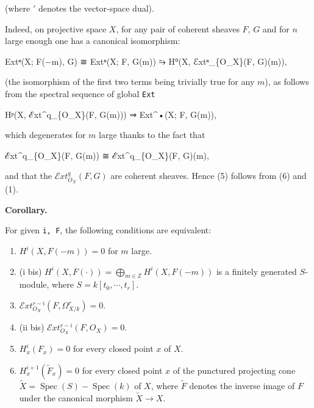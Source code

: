 \documentclass[
]{article}
\newenvironment{Shaded}{}{}
\newcommand{\NormalTok}[1]{#1}
\providecommand{\tightlist}{%
  \setlength{\itemsep}{0pt}\setlength{\parskip}{0pt}}
\begin{document}
(where \('\) denotes the vector-space dual).

Indeed, on projective space \(X\), for any pair of coherent sheaves
\(F\), \(G\) and for \(n\) large enough one has a canonical isomorphism:

\begin{Shaded}
\begin{Highlighting}[]
\NormalTok{Extⁿ(X; F(−m), G) ≅ Extⁿ(X; F, G(m)) ⥲ H⁰(X, ℰxtⁿ\_\{O\_X\}(F, G)(m)),}
\end{Highlighting}
\end{Shaded}

(the isomorphism of the first two terms being trivially true for any
\(m\)), as follows from the spectral sequence of global \texttt{Ext}

\begin{Shaded}
\begin{Highlighting}[]
\NormalTok{Hᵖ(X, ℰxt\^{}q\_\{O\_X\}(F, G(m))) ⇒ Ext\^{}•(X; F, G(m)),}
\end{Highlighting}
\end{Shaded}

which degenerates for \(m\) large thanks to the fact that

\begin{Shaded}
\begin{Highlighting}[]
\NormalTok{ℰxt\^{}q\_\{O\_X\}(F, G(m)) ≅ ℰxt\^{}q\_\{O\_X\}(F, G)(m),}
\end{Highlighting}
\end{Shaded}

and that the \(\mathcal{E}xt^{q}_{O_{X}}(F, G)\) are coherent sheaves.
Hence (5) follows from (6) and (1).

\textbf{Corollary.}

For given \texttt{i,\ F}, the following conditions are equivalent:

\begin{enumerate}
\def\labelenumi{\arabic{enumi}.}
\tightlist
\item
  \(H^{i}(X, F(-m)) = 0\) for \(m\) large.
\item
  (i bis)
  \(H^{i}(X, F(\cdot)) = \bigoplus_{m \in \mathbb{Z}} H^{i}(X, F(-m))\)
  is a finitely generated \(S\)-module, where
  \(S = k[t_{0}, \cdots, t_{r}]\).
\item
  \(\mathcal{E}xt^{r-i}_{O_{X}}(F, \Omega^{r}_{X/k}) = 0\).
\item
  (ii bis) \(\mathcal{E}xt^{r-i}_{O_{X}}(F, O_{X}) = 0\).
\item
  \(H^{i}_{x}(F_{x}) = 0\) for every closed point \(x\) of \(X\).
\item
  \(H^{i+1}_{x}(\tilde{F}_{x}) = 0\) for every closed point \(x\) of the
  punctured projecting cone
  \(\tilde{X} = \operatorname{Spec}(S) - \operatorname{Spec}(k)\) of
  \(X\), where \(\tilde{F}\) denotes the inverse image of \(F\) under
  the canonical morphism \(\tilde{X} \to X\).
\end{enumerate}
\end{document}
